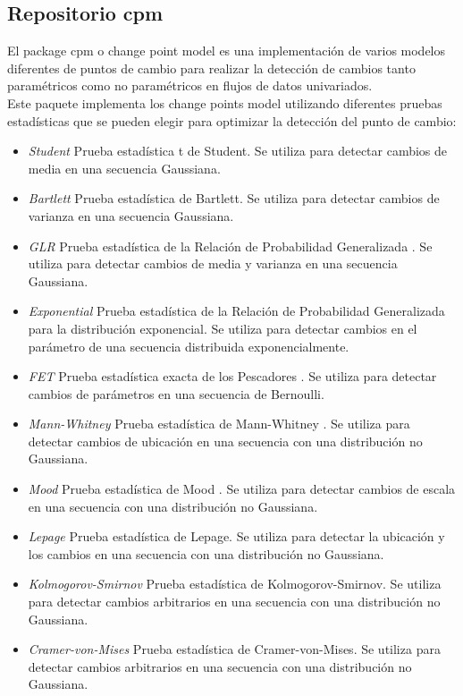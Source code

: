 \documentclass[runningheads,a4paper,12pt]{report}
\begin{document}
\subsection{Repositorio cpm \cite{cpm}}
El package cpm o change point model es una implementación de varios modelos diferentes de puntos de cambio para realizar la detección de cambios tanto paramétricos como no paramétricos en flujos de datos univariados.\\
Este paquete implementa los change points model utilizando diferentes pruebas estadísticas que se pueden elegir para optimizar la detección del punto de cambio:
\begin{itemize}
	\item \textit{Student} Prueba estadística t de Student. Se utiliza para detectar cambios de media en una secuencia Gaussiana.
	\item \textit{Bartlett} Prueba estadística de Bartlett. Se utiliza para detectar cambios de varianza en una secuencia Gaussiana.
	\item \textit{GLR} Prueba estadística de la Relación de Probabilidad Generalizada . Se utiliza para detectar cambios de media y varianza en una secuencia Gaussiana.
	\item \textit{Exponential} Prueba estadística de la Relación de Probabilidad Generalizada para la distribución exponencial. Se utiliza para detectar cambios en el parámetro de una secuencia distribuida exponencialmente.
	\item \textit{FET} Prueba estadística exacta de los Pescadores . Se utiliza para detectar cambios de parámetros en una secuencia de Bernoulli.
	\item \textit{Mann-Whitney} Prueba estadística de Mann-Whitney . Se utiliza para detectar cambios de ubicación en una secuencia con una distribución no Gaussiana.
	\item \textit{Mood} Prueba estadística  de Mood . Se utiliza para detectar cambios de escala en una secuencia con una distribución no Gaussiana.
	\item \textit{Lepage} Prueba estadística de Lepage. Se utiliza para detectar la ubicación y los cambios en una secuencia con una distribución no Gaussiana.
	\item \textit{Kolmogorov-Smirnov} Prueba estadística de Kolmogorov-Smirnov. Se utiliza para detectar cambios arbitrarios en una secuencia con una distribución no Gaussiana.
	\item \textit{Cramer-von-Mises} Prueba estadística de Cramer-von-Mises. Se utiliza para detectar cambios arbitrarios en una secuencia con una distribución no Gaussiana.
\end{itemize}
\end{document}
